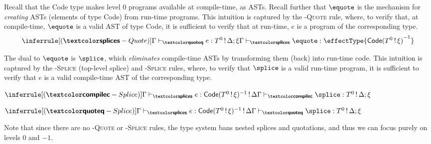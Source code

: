 Recall that the \textsf{Code} type makes level $0$ programs available at compile-time, as ASTs. Recall further that $\equote$ is the mechanism for \textit{creating} ASTs (elements of type \textsf{Code}) from run-time programs. This intuition is captured by the \textsc{\splicemode{}-Quote} rule, where, to verify that, at compile-time, $\equote$ is a valid AST of type \textsf{Code}, it is sufficient to verify that at run-time, $e$ is a program of the corresponding type.
\[\inferrule[(\splicemode{}-Quote)]{\qtypejudge{e}{\runtimecomptype{T^{0}}{\Delta ; \xi}}}{\stypejudge{\equote}{\effectType{\compiletimetype{\textsf{Code}(\runtimecomptype{T^{0}}{\xi})}^{-1}}}}\]

The dual to $\equote$ is $\splice$, which \textit{eliminates} compile-time ASTs by transforming them (back) into run-time code. This intuition is captured by the \textsc{\compilemode{}-Splice} (top-level splice) and \textsc{\quotemode{}-Splice} rules, where, to verify that $\splice$ is a valid run-time program, it is sufficient to verify that $e$ is a valid compile-time AST of the corresponding type. 

\begin{center}
\begin{minipage}[t]{0.5\textwidth}
  \centering
  $\inferrule[(\compilemode{}-Splice)]{\stypejudge[\Gamma]{e}{\textsf{Code}(T^0 \, ! \, \xi)^{-1} \, ! \, \Delta}}{\ctypejudge{\splice}{\runtimecomptype{T^0}{\Delta ; \xi}}}$
\end{minipage}%
\begin{minipage}[t]{0.5\textwidth}
  \centering
  $\inferrule[(\quotemode{}-Splice)]{\stypejudge[\Gamma]{e}{\textsf{Code}(T^0 \, ! \, \xi)^{-1} \, ! \, \Delta}}{\qtypejudge{\splice}{\runtimecomptype{T^0}{\Delta ; \xi}}}$
\end{minipage}
\end{center}


Note that since there are no \textsc{\quotemode-Quote} or \textsc{\splicemode-Splice} rules, the type system bans nested splices and quotations, and thus we can focus purely on levels $0$ and $-1$. 

